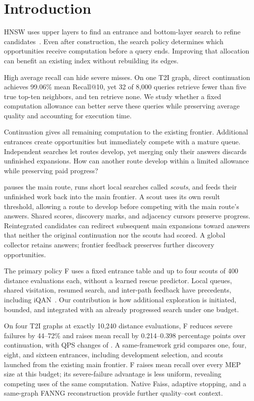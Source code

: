 \section{Introduction}\label{sec:intro}
HNSW uses upper layers to find an entrance and bottom-layer search to refine candidates~\cite{hnsw}. Even after construction, the search policy determines which opportunities receive computation before a query ends. Improving that allocation can benefit an existing index without rebuilding its edges.

High average recall can hide severe misses. On one T2I graph, direct continuation achieves 99.06\% mean Recall@10, yet 32 of 8,000 queries retrieve fewer than five true top-ten neighbors, and ten retrieve none. We study whether a fixed computation allowance can better serve these queries while preserving average quality and accounting for execution time.

Continuation gives all remaining computation to the existing frontier. Additional entrances create opportunities but immediately compete with a mature queue. Independent searches let routes develop, yet merging only their answers discards unfinished expansions. How can another route develop within a limited allowance while preserving paid progress?

\cdsm{} pauses the main route, runs short local searches called \emph{scouts}, and feeds their unfinished work back into the main frontier. A scout uses its own result threshold, allowing a route to develop before competing with the main route's answers. Shared scores, discovery marks, and adjacency cursors preserve progress. Reintegrated candidates can redirect subsequent main expansions toward answers that neither the original continuation nor the scouts had scored. A global collector retains answers; frontier feedback preserves further discovery opportunities.

The primary policy F uses a fixed entrance table and up to four scouts of 400 distance evaluations each, without a learned rescue predictor. Local queues, shared visitation, resumed search, and inter-path feedback have precedents, including iQAN~\cite{iqan}. Our contribution is how additional exploration is initiated, bounded, and integrated with an already progressed search under one budget.

On four T2I graphs at exactly 10,240 distance evaluations, F reduces severe failures by 44--72\% and raises mean recall by 0.214--0.398 percentage points over continuation, with QPS changes of \rTwoQpsC{}. A same-framework grid compares one, four, eight, and sixteen entrances, including development selection, and scouts launched from the existing main frontier. F raises mean recall over every MEP size at this budget; its severe-failure advantage is less uniform, revealing competing uses of the same computation. Native Faiss, adaptive stopping, and a same-graph FANNG reconstruction provide further quality--cost context.

